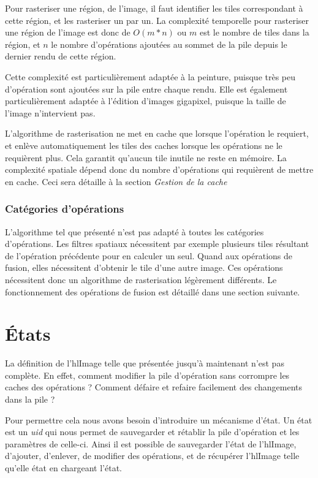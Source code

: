 		Pour rasteriser une région, de l'image, il faut identifier les tiles correspondant à cette région, et les rasteriser un par un. La complexité
		temporelle pour rasteriser une région de l'image est donc de $O(m*n)$ ou $m$ est le nombre de tiles dans la région, et $n$ le nombre d'opérations
		ajoutées au sommet de la pile depuis le dernier rendu de cette région. 

		Cette complexité est particulièrement adaptée à la peinture, puisque très peu d'opération sont ajoutées sur la pile entre chaque rendu.
		Elle est également particulièrement adaptée à l'édition d'images gigapixel, puisque la taille de l'image n'intervient pas. 
		
		L'algorithme de rasterisation ne met en cache que lorsque l'opération le requiert, et enlève automatiquement les tiles des caches lorsque
		les opérations ne le requièrent plus. Cela garantit qu'aucun tile inutile ne reste en mémoire. La complexité spatiale dépend donc du
		nombre d'opérations qui requièrent de mettre en cache. Ceci sera détaille à la section \emph{Gestion de la cache}
		
		\subsubsection{Catégories d'opérations}
		L'algorithme tel que présenté n'est pas adapté à toutes les catégories d'opérations. Les filtres spatiaux nécessitent par exemple plusieurs tiles
		résultant de l'opération précédente pour en calculer un seul. Quand aux opérations de fusion, elles nécessitent d'obtenir le tile d'une
		autre image. Ces opérations nécessitent donc un algorithme de rasterisation légèrement différents. Le fonctionnement des opérations de fusion est détaillé
		dans une section suivante. 
		
	\section{États}
		La définition de l'hlImage telle que présentée jusqu'à maintenant n'est pas complète. En effet, comment modifier la pile d'opération sans
		corrompre les caches des opérations ? Comment défaire et refaire facilement des changements dans la pile ? 
		
		Pour permettre cela nous avons besoin d'introduire un mécanisme d'état. Un état est un \emph{uid} qui nous permet de sauvegarder et rétablir la
		pile d'opération et les paramètres de celle-ci. Ainsi il est possible de sauvegarder l'état de l'hlImage, d'ajouter, d'enlever, 
		de modifier des opérations, et de récupérer l'hlImage telle qu'elle état en chargeant l'état.


